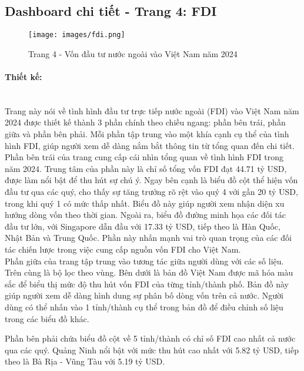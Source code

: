 \documentclass[a4paper]{report}
\begin{document}
{{\subsection{Dashboard chi tiết - Trang 4: FDI}
\begin{figure}[H]
    \centering
    \texttt{[image: images/fdi.png]}
    \caption{Trang 4 - Vốn đầu tư nước ngoài vào Việt Nam năm 2024}
    \label{fig:enter-label}
\end{figure}

\paragraph{Thiết kế: } \mbox{}\\

Trang này nói về tình hình đầu tư trực tiếp nước ngoài (FDI) vào Việt Nam năm 2024 được thiết kế thành 3 phần chính theo chiều ngang: phần bên trái, phần giữa và phần bên phải. Mỗi phần tập trung vào một khía cạnh cụ thể của tình hình FDI, giúp người xem dễ dàng nắm bắt thông tin từ tổng quan đến chi tiết.\\

Phần bên trái của trang cung cấp cái nhìn tổng quan về tình hình FDI trong năm 2024. Trung tâm của phần này là chỉ số tổng vốn FDI đạt 44.71 tỷ USD, được làm nổi bật để thu hút sự chú ý. Ngay bên cạnh là biểu đồ cột thể hiện vốn đầu tư qua các quý, cho thấy sự tăng trưởng rõ rệt vào quý 4 với gần 20 tỷ USD, trong khi quý 1 có mức thấp nhất. Biểu đồ này giúp người xem nhận diện xu hướng dòng vốn theo thời gian. Ngoài ra, biểu đồ đường minh họa các đối tác đầu tư lớn, với Singapore dẫn đầu với 17.33 tỷ USD, tiếp theo là Hàn Quốc, Nhật Bản và Trung Quốc. Phần này nhấn mạnh vai trò quan trọng của các đối tác chiến lược trong việc cung cấp nguồn vốn FDI cho Việt Nam.\\

Phần giữa của trang tập trung vào tương tác giữa người dùng với các số liệu. Trên cùng là bộ lọc theo vùng. Bên dưới là bản đồ Việt Nam được mã hóa màu sắc để biểu thị mức độ thu hút vốn FDI của từng tỉnh/thành phố. Bản đồ này giúp người xem dễ dàng hình dung sự phân bố dòng vốn trên cả nước. Người dùng có thể nhấn vào 1 tỉnh/thành cụ thể trong bản đồ để điều chỉnh số liệu trong các biểu đồ khác.

Phần bên phải chứa biểu đồ cột về 5 tỉnh/thành có chỉ số FDI cao nhất cả nước qua các quý. Quảng Ninh nổi bật với mức thu hút cao nhất với 5.82 tỷ USD, tiếp theo là Bà Rịa - Vũng Tàu với 5.19 tỷ USD.

}}
\end{document}
